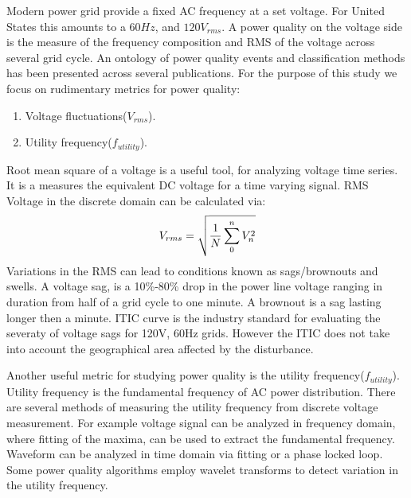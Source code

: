 Modern power grid provide a fixed AC frequency at a set voltage. For United States this amounts to a $60Hz$, and $120V_{rms}$. A power quality on the voltage side is the  measure of the frequency composition and RMS of the voltage across several grid cycle. An ontology of power quality events and classification methods has been presented across several publications.\cite{pq_onto1} \cite{pq_class} For the purpose of this study we focus on rudimentary metrics for power quality:

\begin{enumerate}
\item Voltage fluctuations($V_{rms}$).
\item Utility frequency($f_{utility}$).
\end{enumerate}

Root mean square of a voltage is a useful tool, for analyzing voltage time series. It is a measures the equivalent DC voltage for a time varying signal. RMS Voltage in the discrete domain can be calculated via:
\begin{equation}
\label{eq:rms}
\centering
V_{rms} = \sqrt{\frac{1}{N} \sum_{0}^{n}{V_{n}^2}}
\end{equation}
Variations in the RMS can lead to conditions known as sags/brownouts and swells. A voltage sag, is a 10\%-80\% drop in the power line voltage ranging in duration from half of a grid cycle to one minute. A brownout is a sag lasting longer then a minute. ITIC curve is the industry standard for evaluating the severaty of voltage sags for 120V, 60Hz grids. However the 
ITIC does not take into account the geographical area affected by the disturbance.

Another useful metric for studying power quality is the utility frequency($f_{utility}$). Utility frequency is the fundamental frequency of AC power distribution. There are several methods of measuring the utility frequency from discrete voltage measurement. For example voltage signal can be analyzed in frequency domain, where fitting of the maxima, can be used to extract the fundamental frequency. Waveform can be analyzed in time domain via fitting or a phase locked loop. Some power quality algorithms employ wavelet transforms to detect variation in the utility frequency.\cite{pq_class}

